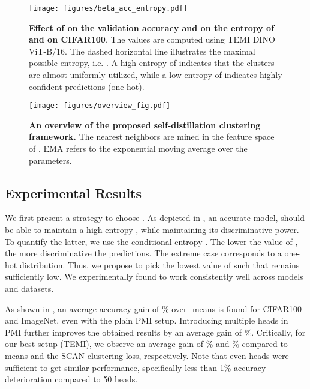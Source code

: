 \documentclass{bmvc2k}
\begin{document}
\begin{figure}[htbp]
\begin{minipage}{.5\textwidth}
     \texttt{[image: figures/beta\_acc\_entropy.pdf]}
\caption{\textbf{Effect of  on the validation accuracy and on the entropy of  and  on CIFAR100}. The values are computed using TEMI DINO ViT-B/16. The dashed horizontal line illustrates the maximal possible entropy, i.e. . A high entropy of  indicates that the clusters are almost uniformly utilized, while a low entropy of  indicates highly confident predictions (one-hot).}
\label{fig:beta_ent}
\end{minipage}
\hfill
\begin{minipage}{.45\textwidth}
\begin{center}
\texttt{[image: figures/overview\_fig.pdf]}
\end{center}
\caption{\textbf{An overview of the proposed self-distillation clustering framework.} The nearest neighbors are mined in the feature space of . EMA refers to the exponential moving average over the parameters.}
\label{fig:diagram}
\end{minipage}
\end{figure}



     
\subsection{Experimental Results}
\label{sec:experimental-results}
We first present a strategy to choose . As depicted in , an accurate model,  should be able to maintain a high entropy , while maintaining its discriminative power. To quantify the latter, we use the conditional entropy . The lower the value of , the more discriminative the predictions. The extreme case  corresponds to a one-hot distribution. Thus, we propose to pick the lowest value of  such that  remains sufficiently low. We experimentally found  to work consistently well across models and datasets. 
 
 
As shown in , an average accuracy gain of \% over -means is found for CIFAR100 and ImageNet, even with the plain PMI setup. Introducing multiple heads in PMI further improves the obtained results by an average gain of \%. Critically, for our best setup (TEMI), we observe an average gain of \% and \% compared to -means and the SCAN clustering loss, respectively. Note that even  heads were sufficient to get similar performance, specifically less
than 1\% accuracy deterioration compared to 50 heads.
\end{document}
